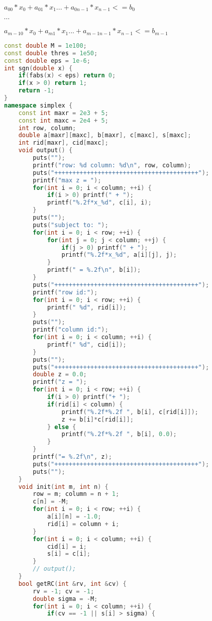 $a_{0 0}*x_0 + a_{0 1}*x_1 ... + a_{0 n - 1}*x_{n - 1} <= b_0$

$\cdots$

$a_{m - 1 0}*x_0 + a_{m 1}*x_1 ... + a_{m - 1 n - 1}*x_{n - 1} <= b_{m - 1}$


\begin{lstlisting}[language=C++]
const double M = 1e100;
const double thres = 1e50;
const double eps = 1e-6;
int sgn(double x) {
    if(fabs(x) < eps) return 0;
    if(x > 0) return 1;
    return -1;
}
namespace simplex {
    const int maxr = 2e3 + 5;
    const int maxc = 2e4 + 5;
    int row, column;
    double a[maxr][maxc], b[maxr], c[maxc], s[maxc];
    int rid[maxr], cid[maxc];
    void output() {
        puts("");
        printf("row: %d column: %d\n", row, column);
        puts("++++++++++++++++++++++++++++++++++++++++");
        printf("max z = ");
        for(int i = 0; i < column; ++i) {
            if(i > 0) printf(" + ");
            printf("%.2f*x_%d", c[i], i);
        }
        puts("");
        puts("subject to: ");
        for(int i = 0; i < row; ++i) {
            for(int j = 0; j < column; ++j) {
                if(j > 0) printf(" + ");
                printf("%.2f*x_%d", a[i][j], j);
            }
            printf(" = %.2f\n", b[i]);
        }
        puts("++++++++++++++++++++++++++++++++++++++++");
        printf("row id:");
        for(int i = 0; i < row; ++i) {
            printf(" %d", rid[i]);
        }
        puts("");
        printf("column id:");
        for(int i = 0; i < column; ++i) {
            printf(" %d", cid[i]);
        }
        puts("");
        puts("++++++++++++++++++++++++++++++++++++++++");
        double z = 0.0;
        printf("z = ");
        for(int i = 0; i < row; ++i) {
            if(i > 0) printf("+ ");
            if(rid[i] < column) {
                printf("%.2f*%.2f ", b[i], c[rid[i]]);
                z += b[i]*c[rid[i]];
            } else {
                printf("%.2f*%.2f ", b[i], 0.0);
            }
        }
        printf("= %.2f\n", z);
        puts("++++++++++++++++++++++++++++++++++++++++");
        puts("");
    }
    void init(int m, int n) {
        row = m; column = n + 1;
        c[n] = -M;
        for(int i = 0; i < row; ++i) {
            a[i][n] = -1.0;
            rid[i] = column + i;
        }
        for(int i = 0; i < column; ++i) {
            cid[i] = i;
            s[i] = c[i];
        }
        // output();
    }
    bool getRC(int &rv, int &cv) {
        rv = -1; cv = -1;
        double sigma = -M;
        for(int i = 0; i < column; ++i) {
            if(cv == -1 || s[i] > sigma) {

\end{lstlisting}
